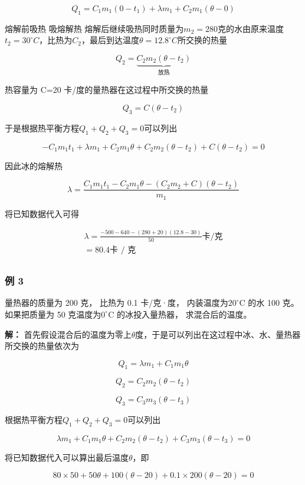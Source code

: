 \[
Q _ {1} = C _ {1} m _ {1} (0 - t _ {1}) + \lambda m _ {1} + C _ {2} m _ {1} (\theta - 0)
\]

熔解前吸热 吸熔解热
熔解后继续吸热同时质量为\(m_{2}=280\)克的水由原来温度\(t_{2}=30^{\circ}C\)，比热为\(C_{2}\)，最后到达温度\(\theta=12.8^{\circ}C\)所交换的热量

\[
Q _ {2} = \underbrace {C _ {2} m _ {2} (\theta - t _ {2})} _ {\text{放热}}
\]

热容量为 C=20 卡/度的量热器在这过程中所交换的热量

\[
Q_3=C(\theta-t_2)
\]

于是根据热平衡方程\(Q_{1} + Q_{2} + Q_{3} = 0\)可以列出

\[
-C_1m_1t_1+\lambda m_1+C_2m_1\theta+C_2m_2(\theta-t_2)+C(\theta-t_2)=0
\]

因此冰的熔解热

\[
\lambda=\frac{C_1m_1t_1-C_2m_1\theta-(C_2m_2+C)(\theta-t_2)}{m_1}
\]

将已知数据代入可得

\[
\begin{array}{l} \lambda = \frac {- 500 - 640 - (280 + 20) (12.8 - 30)}{50} \text{卡/克} \\ = 80.4 \text{卡   /   克} \\ \end{array}
\]

\subsubsection{例 3}\label{ux4f8b-3-6}

量热器的质量为 200 克， 比热为 0.1 卡/克·度， 内装温度为\(20^{\circ}\)C
的水 100 克。 如果把质量为 50 克温度为\(0^{\circ}\)C 的冰投入量热器，
求混合后的温度。

\textbf{解：}
首先假设混合后的温度为零上\(\theta\)度，于是可以列出在这过程中冰、水、量热器所交换的热量依次为

\[
Q_1=\lambda m_1+C_1m_1\theta
\]

\[
Q_2=C_2m_2(\theta-t_2)
\]

\[
Q_3=C_3m_3(\theta-t_3)
\]

根据热平衡方程\(Q_{1} + Q_{2} + Q_{3} = 0\)可以列出

\[
\lambda m_1+C_1m_1\theta+C_2m_2(\theta-t_2)+C_3m_3(\theta-t_3)=0
\]

将已知数据代入可以算出最后温度\(\theta\)，即

\[
80 \times 50 + 50 \theta + 100 (\theta - 20) + 0.1 \times 200 (\theta - 20) = 0
\]

